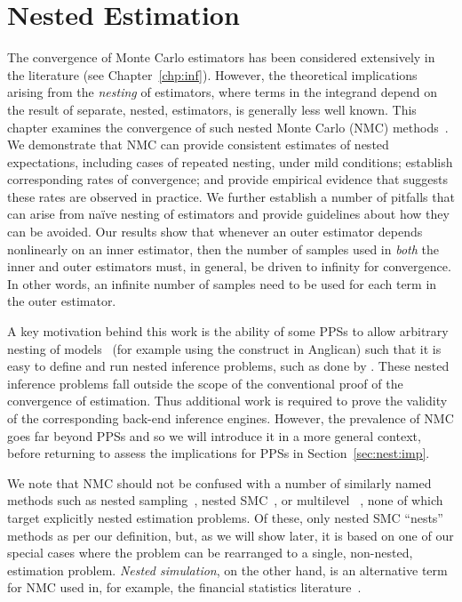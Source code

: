 
\chapter{Nested Estimation}
\label{chp:nest}

The convergence of Monte Carlo estimators has been considered extensively in the
literature (see Chapter~\ref{chp:inf}).  However, the theoretical implications
arising from the \emph{nesting} of \mc estimators, where terms in the integrand depend on the
result of separate, nested, \mc estimators, is generally less well known.
This chapter examines the convergence of such nested Monte Carlo (NMC) 
methods~\citep{rainforth2016pitfalls,rainforth2017pitfalls}.
We demonstrate that NMC can provide consistent estimates of 
nested expectations, including cases of repeated nesting, under mild conditions;
establish corresponding rates of convergence;
and provide empirical evidence that suggests these rates are observed in practice.
We further establish a number of pitfalls that can arise from na\"{i}ve nesting of \mc estimators
and provide guidelines about how they can be avoided.
Our results show that whenever an outer estimator depends nonlinearly on an inner
estimator, then the number of samples used in \emph{both} the inner and outer estimators
must, in general, be driven to infinity for convergence.  In other words, an infinite number of samples
need to be used for each term in the outer estimator.

A key motivation behind this work is the ability of some PPSs to allow
arbitrary nesting of models~\citep{mantadelis2011nesting,stuhlmuller2014reasoning} (for example using
 the \conditional construct in Anglican)
such that it is easy to define and run nested inference problems, such as done
by \citep{ouyang2016practical,le2016nested}. These nested inference problems fall outside the
scope of the conventional proof of the convergence of \mc estimation. Thus additional
work is required to prove the validity of the corresponding back-end inference engines.
However, the prevalence of NMC goes far beyond PPSs and so we will introduce it in
a more general context, before returning to assess the implications for PPSs in Section~\ref{sec:nest:imp}.

We note that NMC should not be confused with a number of similarly named methods such
as nested sampling~\citep{skilling2004nested}, nested SMC~\citep{naessethLS2015nested}, or multilevel 
\mc~\citep{heinrich2001multilevel}, none of
which target explicitly nested estimation problems.  Of these, only nested SMC ``nests'' \mc
methods as per our definition, but, as we will show later, it is based on one of our special cases
where the problem can be rearranged to a single, non-nested, estimation problem.  
\emph{Nested simulation}, on the other hand, is an alternative term for NMC
used in, for example, the financial statistics literature~\citep{gordy2010nested}.









%
%

%
